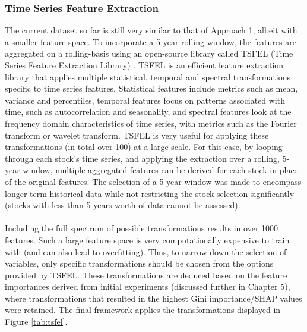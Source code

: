 \documentclass[a4paper]{report}
\begin{document}
\subsubsection{Time Series Feature Extraction}
The current dataset so far is still very similar to that of Approach 1, albeit with a smaller feature space. To incorporate a 5-year rolling window, the features are 
aggregated on a rolling-basis using an open-source library called TSFEL (Time Series Feature Extraction Library) \citep{barandas2020tsfel}. TSFEL is an efficient feature extraction library 
that applies multiple statistical, temporal and spectral transformations specific to time series features.
Statistical features include metrics such as mean, variance and percentiles, temporal features focus on patterns associated with time, such as autocorrelation and seasonality, and spectral features 
look at the frequency domain characteristics of time series, with metrics such as the Fourier transform or wavelet transform. TSFEL is very useful for applying these transformations 
(in total over 100) at a large scale. For this case, by looping through each 
stock's time series, and applying the extraction over a rolling, 5-year window, multiple aggregated features can be derived for each stock in place of the original features. The selection of a 
5-year window was made to encompass longer-term historical data while not restricting the stock selection significantly (stocks with less than 5 years worth of data cannot be assessed).\\\\Including 
the full spectrum of possible transformations results in over 1000 features. Such a large feature space is very computationally expensive to train with (and can also lead to overfitting). Thus, to narrow 
down the selection of variables, only specific transformations should be chosen from the options provided by TSFEL. These transformations are deduced based on the 
feature importances derived from initial experiments (discussed further in Chapter 5), where transformations that resulted in the highest Gini importance/SHAP values were retained. The final framework applies the transformations displayed in Figure \ref{tab:tsfel}.
\end{document}
